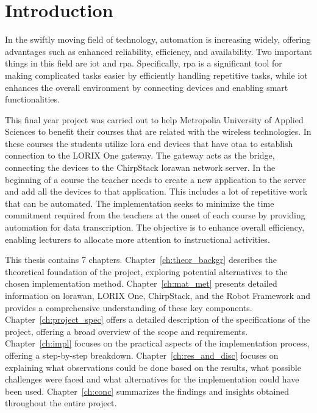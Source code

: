
\chapter{Introduction}

In the swiftly moving field of technology, automation is increasing widely, offering advantages such as enhanced reliability, efficiency, and availability.
Two important things in this field are  \gls{iot} and \gls{rpa}. Specifically, \gls{rpa} is a significant tool for making complicated tasks easier by efficiently handling repetitive tasks, while \gls{iot} enhances the overall environment by connecting devices and enabling smart functionalities. 

This final year project was carried out to help Metropolia University of Applied Sciences to benefit their courses that are related with the wireless technologies.
In these courses the students utilize \gls{lora} end devices that have \gls{otaa} to establish connection to the LORIX One gateway.
The gateway acts as the bridge, connecting the devices to the ChirpStack \gls{lorawan} network server.
In the beginning of a course the teacher needs to create a new application to the server and add all the devices to that application.
This includes a lot of repetitive work that can be automated.
The implementation seeks to minimize the time commitment required from the teachers at the onset of each course by providing automation for data transcription.
The objective is to enhance overall efficiency, enabling lecturers to allocate more attention to instructional activities.

This thesis contains 7 chapters.
Chapter~\ref{ch:theor_backgr} describes the theoretical foundation of the project, exploring potential alternatives to the chosen implementation method.
Chapter~\ref{ch:mat_met} presents detailed information on \gls{lorawan}, LORIX One, ChirpStack, and the Robot Framework and provides a comprehensive understanding of these key components.
Chapter~\ref{ch:project_spec} offers a detailed description of the  specifications of the project, offering a broad overview of the scope and requirements. 
Chapter~\ref{ch:impl} focuses on the practical aspects of the implementation process, offering a step-by-step breakdown.
Chapter~\ref{ch:res_and_disc} focuses on explaining what observations could be done based on the results, what possible challenges were faced and what alternatives for the implementation could have been used.
Chapter~\ref{ch:conc} summarizes the findings and insights obtained throughout the entire project.


\clearpage %
